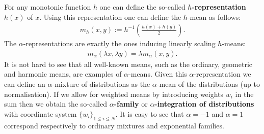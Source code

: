     For any monotonic function $h$ one can define the so-called \textbf{$h$-representation} $h(x)$ of $x$. Using this representation one can define the $h$-mean as follows:
    \begin{gather}
        m_h(x, y) := h^{-1}\left(\frac{h(x)+h(y)}{2}\right).
    \end{gather}
    The $\alpha$-representations are exactly the ones inducing linearly scaling $h$-means:
    \begin{gather}
        m_\alpha(\lambda x, \lambda y) = \lambda m_\alpha(x, y).
    \end{gather}
    It is not hard to see that all well-known means, such as the ordinary, geometric and harmonic means, are examples of $\alpha$-means. Given this $\alpha$-representation we can define an $\alpha$-mixture of distributions as the $\alpha$-mean of the distributions (up to normalisation). If we allow for weighted means by introducing weights $w_i$ in the sum then we obtain the so-called \textbf{$\alpha$-family} or \textbf{$\alpha$-integration of distributions} with coordinate system $\{w_i\}_{1\leq i\leq N}$. It is easy to see that $\alpha=-1$ and $\alpha=1$ correspond respectively to ordinary mixtures and exponential families.